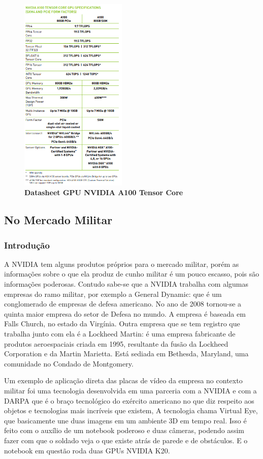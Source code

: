 \documentclass[conference]{IEEEtran}
\begin{document}
\begin{figure}[!h]
\centerline{\includegraphics[width = 2.0in]{datasheet a100 tensor core.png}}
\caption{\textbf{Datasheet GPU NVIDIA A100 Tensor Core}}
\label{figAM9300}
\end{figure}

\subsection{No Mercado Militar}
\subsubsection{Introdução}
\par A NVIDIA tem alguns produtos próprios para o mercado militar, porém as informações sobre o que ela produz de cunho militar é um pouco escasso, pois são informações poderosas. Contudo sabe-se que a NVIDIA trabalha com algumas empresas do ramo militar, por exemplo a General Dynamic: que é um conglomerado de empresas de defesa americano. No ano de 2008 tornou-se a quinta maior empresa do setor de Defesa no mundo. A empresa é baseada em Falls Church, no estado da Virgínia. Outra empresa que se tem registro que trabalha junto com ela é a Lockheed Martin: é uma empresa fabricante de produtos aeroespaciais criada em 1995, resultante da fusão da Lockheed Corporation e da Martin Marietta. Está sediada em Bethesda, Maryland, uma comunidade no Condado de Montgomery.
\par Um exemplo de aplicação direta das placas de vídeo da empresa no contexto militar foi uma tecnologia desenvolvida em uma parceria com a NVIDIA e com a DARPA que é o braço tecnológico do exército americano no que diz respeito aos objetos e tecnologias mais incríveis que existem, A tecnologia chama Virtual Eye, que basicamente une duas imagens em um ambiente 3D em tempo real. Isso é feito com o auxílio de um notebook poderoso e duas câmeras, podendo assim fazer com que o soldado veja o que existe atrás de parede e de obstáculos. E o notebook em questão roda duas GPUs NVIDIA K20.
\end{document}
